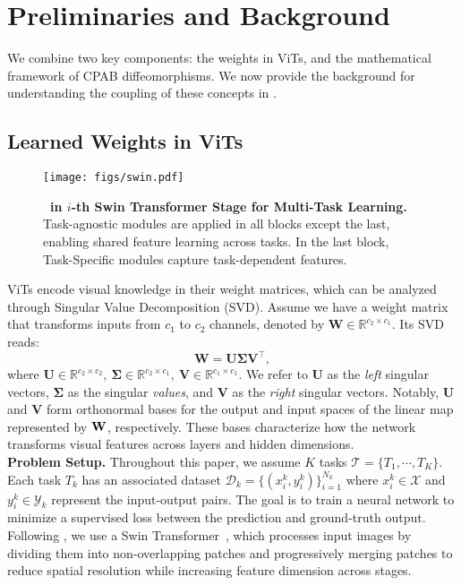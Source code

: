 \section{Preliminaries and Background}
\label{sec:background}
We combine two key components: the weights in ViTs, and the mathematical framework of CPAB diffeomorphisms. We now provide the background for understanding the coupling of these concepts in \ourmethod.

\subsection{Learned Weights in ViTs}
\label{sec:learned_weights_vits}
\begin{figure}[t]
    \centering
\texttt{[image: figs/swin.pdf]}
    \caption{\textbf{\ourmethod\ in $i$-th Swin Transformer Stage for Multi-Task Learning.} Task-agnostic modules are applied in all blocks except the last, enabling shared feature learning across tasks. In the last block, Task-Specific modules capture task-dependent features.
    }
    \label{fig:mtlora}
\end{figure}
ViTs encode visual knowledge in their weight matrices, which can be analyzed through Singular Value Decomposition (SVD). Assume we have a weight matrix that transforms inputs from $c_1$  to $c_2$ channels, denoted by $\mathbf{W} \in \mathbb{R}^{c_2 \times c_1}$. Its SVD reads:
\begin{equation}
    \label{eq:svd_weight_matrix}
    \mathbf{W} = \mathbf{U} \mathbf{\Sigma} \mathbf{V}^\top,
\end{equation}
where $\mathbf{U} \in \mathbb{R}^{c_2 \times c_2}, \ \mathbf{\Sigma} \in \mathbb{R}^{c_2 \times c_1}, \ \mathbf{V} \in \mathbb{R}^{c_1 \times c_1}$. 
We refer to $\mathbf{U}$ as the \emph{left} singular vectors, $\mathbf{\Sigma}$ as the singular \emph{values}, and $\mathbf{V}$ as the \emph{right} singular vectors. Notably, $\mathbf{U}$ and $\mathbf{V}$ form orthonormal bases for the output and input spaces of the linear map represented by ${\mathbf{W}}$, respectively. These bases characterize how the network transforms visual features across layers and hidden dimensions. 
\\
\noindent\textbf{Problem Setup.} Throughout this paper, we assume  $K$ tasks $\mathcal{T} = \{T_1, \cdots, T_K\}$. Each task $T_k$ has an associated dataset $\mathcal{D}_k = \{(x_i^k, y_i^k)\}_{i=1}^{N_k}$ where $x_i^k \in \mathcal{X}$ and $y_i^k \in \mathcal{Y}_k$ represent the input-output pairs. The goal is to train a neural network to minimize a supervised loss between the prediction and ground-truth output. Following \cite{agiza2024mtlora}, we use a Swin Transformer~\cite{liu2021swin}, which processes input images by dividing them into non-overlapping patches and progressively merging patches to reduce spatial resolution while increasing feature dimension across stages. 

